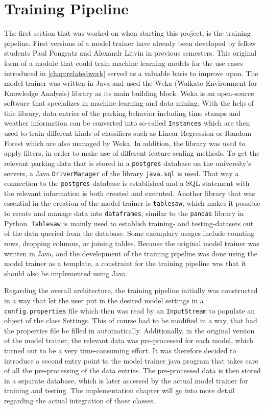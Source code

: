 \section{Training Pipeline}

The first section that was worked on when starting this project, is the training pipeline. First versions of a model trainer have already been developed by fellow students Paul Pongratz and Alexandr Litvin in previous semesters. This original form of a module that could train machine learning models for the use cases introduced in \autoref{chap:relatedwork} served as a valuable basis to improve upon. The model trainer was written in Java and used the Weka (Waikato Environment for Knowledge Analysis) \cite{eibe2016} library as its main building block. Weka is an open-source software that specializes in machine learning and data mining. With the help of this library, data entries of the parking behavior including time stamps and weather information can be converted into so-called \texttt{Instances} which are then used to train different kinds of classifiers such as Linear Regression or Random Forest which are also managed by Weka. In addition, the library was used to apply filters, in order to make use of different feature-scaling methods. To get the relevant parking data that is stored in a \texttt{postgres} database on the university's servers, a Java \texttt{DriverManager} of the library \texttt{java.sql} is used. That way a connection to the \texttt{postgres} database is established and a SQL statement with the relevant information is both created and executed. Another library that was essential in the creation of the model trainer is \texttt{tablesaw}, which makes it possible to create and manage data into \texttt{dataframes}, similar to the \texttt{pandas} library in Python. \texttt{Tablesaw} is mainly used to establish training- and testing-datasets out of the data queried from the database. Some exemplary usages include counting rows, dropping columns, or joining tables. Because the original model trainer was written in Java, and the development of the training pipeline was done using the model trainer as a template, a constraint for the training pipeline was that it should also be implemented using Java.

Regarding the overall architecture, the training pipeline initially was constructed in a way that let the user put in the desired model settings in a \texttt{config.properties} file which then was read by an \texttt{InputStream} to populate an object of the class Settings. This of course had to be modified in a way, that had the properties file be filled in automatically. Additionally, in the original version of the model trainer, the relevant data was pre-processed for each model, which turned out to be a very time-consuming effort. It was therefore decided to introduce a second entry point to the model trainer java program that takes care of all the pre-processing of the data entries. The pre-processed data is then stored in a separate database, which is later accessed by the actual model trainer for training and testing. The implementation chapter will go into more detail regarding the actual integration of those classes.

